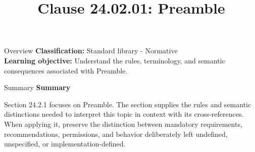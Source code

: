 \documentclass[10pt,letterpaper]{article}
\title{Clause 24.02.01: Preamble}
\author{}
\date{}
\begin{document}
\maketitle
\begin{CornellOverviewBox}{Overview}
\textbf{Classification:} Standard library - Normative\\[2pt]
\textbf{Learning objective:} Understand the rules, terminology, and semantic consequences associated with Preamble.
\end{CornellOverviewBox}\begin{CornellSummaryBox}{Summary}
{\sffamily\bfseries\color{Accent} Summary}\par\vspace{3pt}Section 24.2.1 focuses on Preamble. The section supplies the rules and semantic distinctions needed to interpret this topic in context with its cross-references. When applying it, preserve the distinction between mandatory requirements, recommendations, permissions, and behavior deliberately left undefined, unspecified, or implementation-defined.
\end{CornellSummaryBox}
\end{document}
